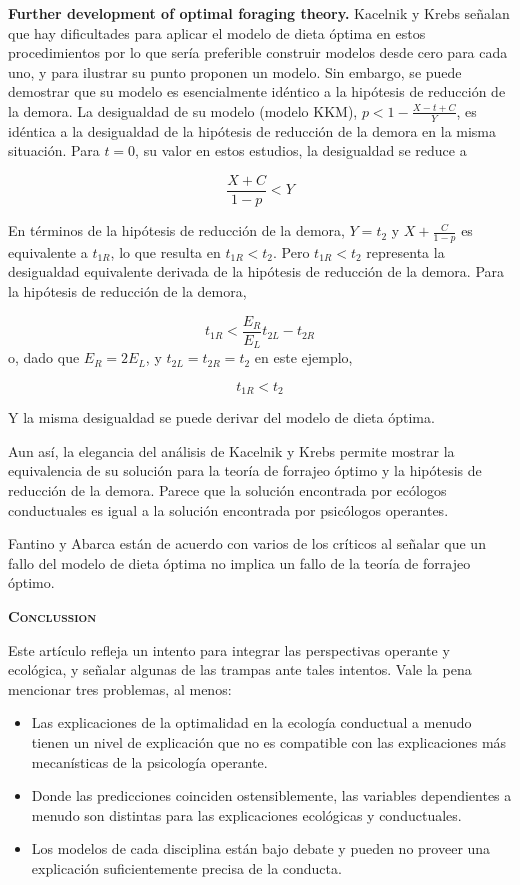 \documentclass[a4paper,12pt]{article}
\begin{document}
{\bfseries Further development of optimal foraging theory.} Kacelnik y Krebs señalan que hay dificultades para aplicar el modelo de dieta óptima en estos procedimientos por lo que sería preferible construir modelos desde cero para cada uno, y para ilustrar su punto proponen un modelo. Sin embargo, se puede demostrar que su modelo es esencialmente idéntico a la hipótesis de reducción de la demora. La desigualdad de su modelo (modelo KKM), $p < 1 - \frac{X-t+C}{Y}$, es idéntica a la desigualdad de la hipótesis de reducción de la demora en la misma situación. Para $t=0$, su valor en estos estudios, la desigualdad se reduce a

$$
\frac{
	X + C
}{
	1 - p
}
<
Y
$$

En términos de la hipótesis de reducción de la demora, $Y=t_{2}$ y $X + \frac{C}{1-p}$ es equivalente a $t_{1R}$, lo que resulta en $t_{1R} < t_{2}$. Pero $t_{1R} < t_{2}$ representa la desigualdad equivalente derivada de la hipótesis de reducción de la demora. Para la hipótesis de reducción de la demora,

$$
t_{1R}
<
\frac{
	E_{R}
}{
	E_{L}
}
t_{2L} - t_{2R}
$$
o, dado que $E_{R} = 2E_{L}$, y $t_{2L} = t_{2R} = t_{2}$ en este ejemplo,

$$
t_{1R} < t_{2}
$$

Y la misma desigualdad se puede derivar del modelo de dieta óptima.

Aun así, la elegancia del análisis de Kacelnik y Krebs permite mostrar la equivalencia de su solución para la teoría de forrajeo óptimo y la hipótesis de reducción de la demora. Parece que la solución encontrada por ecólogos conductuales es igual a la solución encontrada por psicólogos operantes. 

Fantino y Abarca están de acuerdo con varios de los críticos al señalar que un fallo del modelo de dieta óptima no implica un fallo de la teoría de forrajeo óptimo.

{\scshape\bfseries Conclussion}

Este artículo refleja un intento para integrar las perspectivas operante y ecológica, y señalar algunas de las trampas ante tales intentos. Vale la pena mencionar tres problemas, al menos:
\begin{itemize}
	\item Las explicaciones de la optimalidad en la ecología conductual a menudo tienen un nivel de explicación que no es compatible con las explicaciones más mecanísticas de la psicología operante.
	\item Donde las predicciones coinciden ostensiblemente, las variables dependientes a menudo son distintas para las explicaciones ecológicas y conductuales.
	\item Los modelos de cada disciplina están bajo debate y pueden no proveer una explicación suficientemente precisa de la conducta.
\end{itemize}
\end{document}
